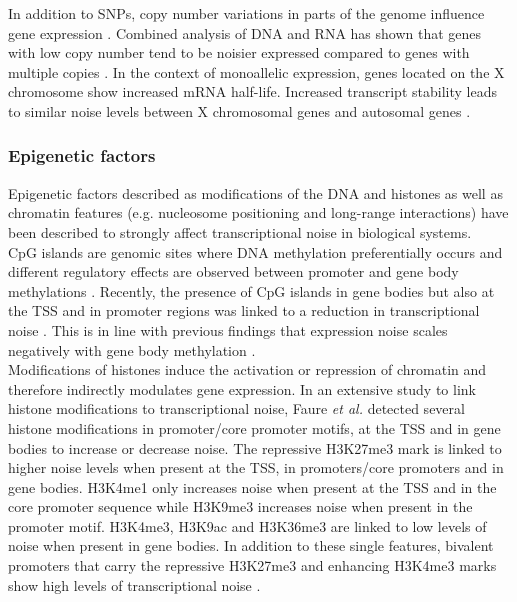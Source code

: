 In addition to SNPs, copy number variations in parts of the genome influence gene expression \todo{[ref]}. Combined analysis of DNA and RNA has shown that genes with low copy number tend to be noisier expressed compared to genes with multiple copies \citep{Dey2015}. In the context of monoallelic expression, genes located on the X chromosome show increased mRNA half-life. Increased transcript stability leads to similar noise levels between X chromosomal genes and autosomal genes \citep{Faure2017}.

\subsubsection{Epigenetic factors}

Epigenetic factors described as modifications of the DNA and histones as well as chromatin features (e.g. nucleosome positioning and long-range interactions) have been described to strongly affect transcriptional noise in biological systems. \\
CpG islands are genomic sites where DNA methylation preferentially occurs and different regulatory effects are observed between promoter and gene body methylations .  Recently, the presence of CpG islands in gene bodies but also at the TSS and in promoter regions was linked to a reduction in transcriptional noise \citep{Faure2017}. This is in line with previous findings that expression noise scales negatively with gene body methylation \cite{Huh2013}.\\
Modifications of histones induce the activation or repression of chromatin and  therefore indirectly modulates gene expression\citep{Suganuma2011}. In an extensive study to link histone modifications to transcriptional noise, Faure \textit{et al.} detected several histone modifications in promoter/core promoter motifs, at the TSS and in gene bodies to increase or decrease noise.  The repressive H3K27me3 mark is linked to higher noise levels when present at the TSS, in promoters/core promoters and in gene bodies. H3K4me1 only increases noise when present at the TSS and in the core promoter sequence while H3K9me3 increases noise when present in the promoter motif. H3K4me3, H3K9ac and H3K36me3 are linked to low levels of noise when present in gene bodies. In addition to these single features, bivalent promoters that carry the repressive H3K27me3 and enhancing H3K4me3 marks show high levels of transcriptional noise \citep{Faure2017}.\\ 
